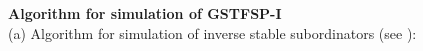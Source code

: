 \documentclass[11pt,oneside,reqno]{amsart}
\theoremstyle{definition}
\theoremstyle{remarkstyle}
\newcommand{\ceil}[1]{\lceil{#1}\rceil}
\begin{document}
{\bf Algorithm for simulation of GSTFSP-I} \\ 

\noindent
(a) Algorithm for simulation of inverse stable subordinators (see \citet{Maheshwari2019}): \\
\end{document}
